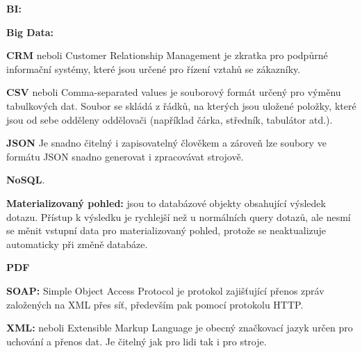 \documentclass[czech,BP]{thesiskiv}
\begin{document}
\hspace{0,5cm} \textbf{BI:}  \cite{BI}

\textbf{Big Data:}  \cite{BigData}

\textbf{CRM} neboli Customer Relationship Management je zkratka pro podpůrné informační systémy, které jsou určené pro řízení vztahů se zákazníky.

\textbf{CSV} neboli Comma-separated values je souborový formát určený pro výměnu tabulkových dat. Soubor se skládá z řádků, na kterých jsou uložené položky, které jsou od sebe odděleny oddělovači (například čárka, středník, tabulátor atd.).

\textbf{JSON}  Je snadno čitelný i zapisovatelný člověkem a zároveň lze soubory ve formátu JSON snadno generovat i zpracovávat strojově.\cite{JSON}

\textbf{NoSQL}.\cite{NoSQL}

\textbf{Materializovaný pohled:} jsou to databázové objekty obsahující výsledek dotazu. Přístup k výsledku je rychlejší než u normálních query dotazů, ale nesmí se měnit vstupní data pro materializovaný pohled, protože se neaktualizuje automaticky při změně databáze.

\textbf{PDF}  \citealp{PDF}

\textbf{SOAP:} Simple Object Access Protocol je protokol zajišťující přenos zpráv založených na XML přes síť, především pak pomocí protokolu HTTP.

\textbf{XML:} neboli Extensible Markup Language je obecný značkovací jazyk určen pro uchování a přenos dat. Je čitelný jak pro lidi tak i pro stroje.


{\raggedright\small

}
\end{document}
